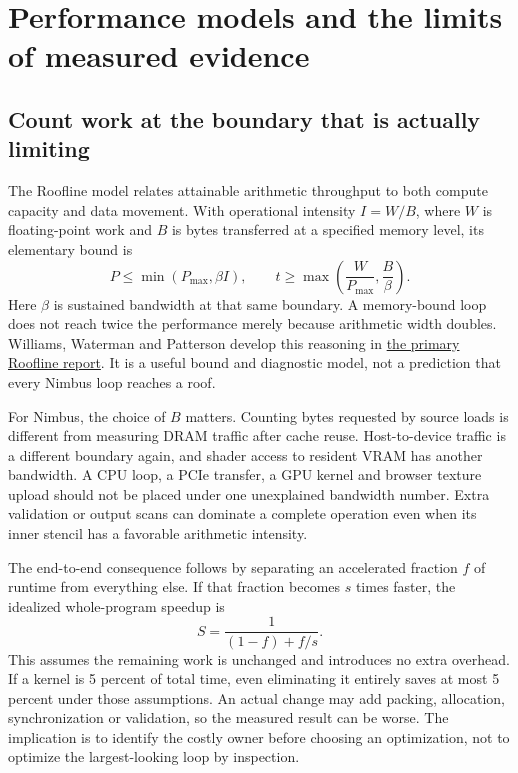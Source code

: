 \section{Performance models and the limits of measured evidence}
\label{architecture-performance}

\subsection{Count work at the boundary that is actually limiting}

The Roofline model relates attainable arithmetic throughput to both compute
capacity and data movement. With operational intensity $I=W/B$, where $W$ is
floating-point work and $B$ is bytes transferred at a specified memory level,
its elementary bound is
\[
 P\leq\min(P_{\max},\beta I),
 \qquad
 t\geq\max\left(\frac{W}{P_{\max}},\frac{B}{\beta}\right).
\]
Here $\beta$ is sustained bandwidth at that same boundary. A memory-bound loop
does not reach twice the performance merely because arithmetic width doubles.
Williams, Waterman and Patterson develop this reasoning in
\href{https://www2.eecs.berkeley.edu/Pubs/TechRpts/2008/EECS-2008-134.pdf}{the
primary Roofline report}. It is a useful bound and diagnostic model, not a
prediction that every Nimbus loop reaches a roof.

For Nimbus, the choice of $B$ matters. Counting bytes requested by source
loads is different from measuring DRAM traffic after cache reuse. Host-to-device
traffic is a different boundary again, and shader access to resident VRAM has
another bandwidth. A CPU loop, a PCIe transfer, a GPU kernel and browser
texture upload should not be placed under one unexplained bandwidth number.
Extra validation or output scans can dominate a complete operation even when
its inner stencil has a favorable arithmetic intensity.

The end-to-end consequence follows by separating an accelerated fraction $f$
of runtime from everything else. If that fraction becomes $s$ times faster,
the idealized whole-program speedup is
\[
 S=\frac{1}{(1-f)+f/s}.
\]
This assumes the remaining work is unchanged and introduces no extra overhead.
If a kernel is 5 percent of total time, even eliminating it entirely saves at
most 5 percent under those assumptions. An actual change may add packing,
allocation, synchronization or validation, so the measured result can be worse.
The implication is to identify the costly owner before choosing an optimization,
not to optimize the largest-looking loop by inspection.

